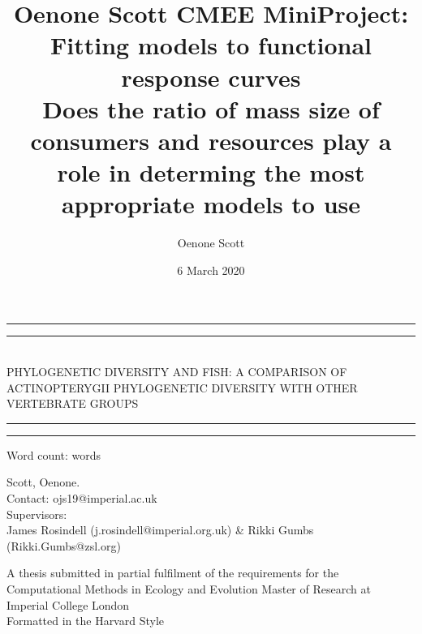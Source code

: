 \documentclass[11pt]{article}
\title {Oenone Scott CMEE MiniProject: Fitting models to functional response 
curves \\ Does the ratio of mass size of consumers and resources play a role in 
determing the most appropriate models to use}
\author{Oenone Scott}
\date{6 March 2020}
\newcommand\wordcount{}
\begin{document}
\begin{titlepage}


	\centering %
		
	
	
	
	\vspace*{3\baselineskip}
	
	\rule{\textwidth}{1.6pt}\vspace*{-\baselineskip}\vspace*{2pt} %
	\rule{\textwidth}{0.4pt} %
	
	\vspace{0.75\baselineskip} %
	
	{\\ PHYLOGENETIC DIVERSITY AND FISH: A COMPARISON OF ACTINOPTERYGII 
	PHYLOGENETIC DIVERSITY WITH OTHER VERTEBRATE GROUPS \\} 
	
	\vspace{0.75\baselineskip} %
	
	\rule{\textwidth}{0.4pt}\vspace*{-\baselineskip}\vspace{3.2pt} 
	\rule{\textwidth}{1.6pt} 
	
	\vspace{2\baselineskip} 
	
	
	Word count: 	
	\wordcount words
		
	\vspace{0.5 \baselineskip} %
	

	Scott, Oenone. \\
	
	Contact: ojs19@imperial.ac.uk \\
	
	Supervisors:  \\ James Rosindell (j.rosindell@imperial.org.uk) \& Rikki 
	Gumbs (Rikki.Gumbs@zsl.org)
	
	\vspace*{1\baselineskip}
	
	A thesis submitted in partial fulfilment of the requirements for the 
	Computational Methods in Ecology and Evolution Master of Research at 
	Imperial College London \\
	Formatted in the Harvard Style \\

\end{titlepage}
\end{document}
